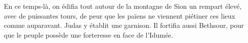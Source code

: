 En ce temps-là, on édifia tout autour de la montagne de Sion un rempart élevé,
	avec de puissantes tours,
	de peur que les païens ne viennent piétiner ces lieux comme auparavant.
Judas y établit une garnison.
Il fortifia aussi Bethsour, pour que le peuple possède une forteresse en face de l’Idumée.
